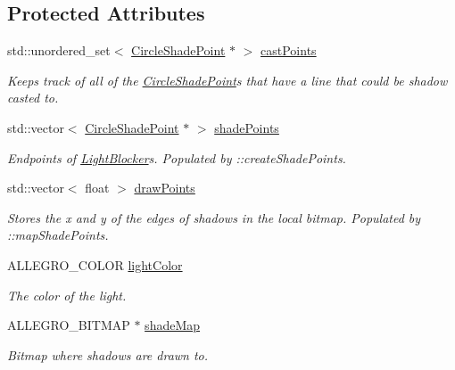 \subsection*{Protected Attributes}
\begin{DoxyCompactItemize}
\item 
std\+::unordered\+\_\+set$<$ \hyperlink{classlighting_1_1CircleShadePoint}{Circle\+Shade\+Point} $\ast$ $>$ \hyperlink{classlighting_1_1CircleLightSource_ab25c86954fad0715d502d1f60649ede4}{cast\+Points}
\begin{DoxyCompactList}\small\item\em Keeps track of all of the \hyperlink{classlighting_1_1CircleShadePoint}{Circle\+Shade\+Point}s that have a line that could be shadow casted to. \end{DoxyCompactList}\item 
std\+::vector$<$ \hyperlink{classlighting_1_1CircleShadePoint}{Circle\+Shade\+Point} $\ast$ $>$ \hyperlink{classlighting_1_1CircleLightSource_acdfea64be9d142f669338c5e206e753e}{shade\+Points}
\begin{DoxyCompactList}\small\item\em Endpoints of \hyperlink{classlighting_1_1LightBlocker}{Light\+Blocker}s. Populated by \+::create\+Shade\+Points. \end{DoxyCompactList}\item 
std\+::vector$<$ float $>$ \hyperlink{classlighting_1_1CircleLightSource_ac1a26422cd969278b321679503d42a07}{draw\+Points}
\begin{DoxyCompactList}\small\item\em Stores the x and y of the edges of shadows in the local bitmap. Populated by \+::map\+Shade\+Points. \end{DoxyCompactList}\item 
A\+L\+L\+E\+G\+R\+O\+\_\+\+C\+O\+L\+OR \hyperlink{classlighting_1_1CircleLightSource_a39d1b9f5bfb54facf6a7e36ed0ffda82}{light\+Color}
\begin{DoxyCompactList}\small\item\em The color of the light. \end{DoxyCompactList}\item 
A\+L\+L\+E\+G\+R\+O\+\_\+\+B\+I\+T\+M\+AP $\ast$ \hyperlink{classlighting_1_1CircleLightSource_a382414c9318853e93c85bc64bcd19f4e}{shade\+Map}
\begin{DoxyCompactList}\small\item\em Bitmap where shadows are drawn to. \end{DoxyCompactList}\item 

\end{DoxyCompactItemize}
